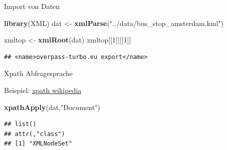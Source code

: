 \documentclass[ignorenonframetext,]{beamer}
\newenvironment{Shaded}{\begin{snugshade}}{\end{snugshade}}
\newcommand{\DecValTok}[1]{\textcolor[rgb]{0.00,0.00,0.81}{#1}}
\newcommand{\KeywordTok}[1]{\textcolor[rgb]{0.13,0.29,0.53}{\textbf{#1}}}
\newcommand{\NormalTok}[1]{#1}
\newcommand{\StringTok}[1]{\textcolor[rgb]{0.31,0.60,0.02}{#1}}
\begin{document}
\begin{frame}[fragile]{Import von Daten}
\protect\hypertarget{import-von-daten}{}

\begin{Shaded}
\begin{Highlighting}[]
\KeywordTok{library}\NormalTok{(XML)}
\NormalTok{dat <-}\StringTok{ }\KeywordTok{xmlParse}\NormalTok{(}\StringTok{"../data/bus_stop_amsterdam.kml"}\NormalTok{)}
\end{Highlighting}
\end{Shaded}

\begin{Shaded}
\begin{Highlighting}[]
\NormalTok{xmltop <-}\StringTok{ }\KeywordTok{xmlRoot}\NormalTok{(dat)}
\NormalTok{xmltop[[}\DecValTok{1}\NormalTok{]][[}\DecValTok{1}\NormalTok{]]}
\end{Highlighting}
\end{Shaded}

\begin{verbatim}
## <name>overpass-turbo.eu export</name>
\end{verbatim}

\end{frame}

\begin{frame}[fragile]{Xpath Abfragesprache}
\protect\hypertarget{xpath-abfragesprache}{}

\begin{block}{Beispiel: \href{https://de.wikipedia.org/wiki/XPath}{xpath
wikipedia}}

\begin{Shaded}
\begin{Highlighting}[]
\KeywordTok{xpathApply}\NormalTok{(dat,}\StringTok{"Document"}\NormalTok{)}
\end{Highlighting}
\end{Shaded}

\begin{verbatim}
## list()
## attr(,"class")
## [1] "XMLNodeSet"
\end{verbatim}

\end{block}

\end{frame}
\end{document}
